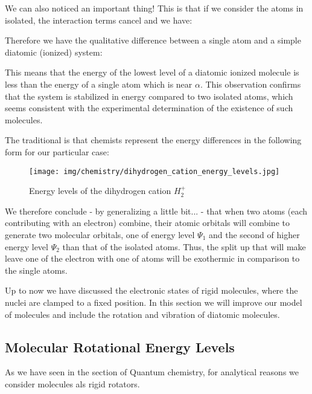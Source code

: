 	We can also noticed an important thing! This is that if we consider the atoms in isolated, the interaction terms cancel and we have:
	
	Therefore we have the qualitative difference between a single atom and a simple diatomic (ionized) system:
	
	This means that the energy of the lowest level of a diatomic ionized molecule is less than the energy of a single atom which is near $\alpha$. This observation confirms that the system is stabilized in energy compared to two isolated atoms, which seems consistent with the experimental determination of the existence of such molecules.
	
	The traditional is that chemists represent the energy differences in the following form for our particular case:
	\begin{figure}[H]
		\begin{center}
		\texttt{[image: img/chemistry/dihydrogen\_cation\_energy\_levels.jpg]}
		\end{center}	
		\caption{Energy levels of the dihydrogen cation $H_2^+$}
	\end{figure}
	We therefore conclude - by generalizing a little bit... - that when two atoms (each contributing with an electron) combine, their atomic orbitals will combine to generate two molecular orbitals, one of energy level $\Psi_1$ and the second of higher energy level $\Psi_2$ than that of the isolated atoms. Thus, the split up that will make leave one of the electron with one of atoms will be exothermic in comparison to the single atoms.
	
	Up to now we have discussed the electronic states of rigid molecules, where the nuclei are clamped to a fixed position. In this section we will improve our model of molecules and include the rotation and vibration of diatomic molecules.

	\pagebreak
	\subsection{Molecular Rotational Energy Levels}
	As we have seen in the section of Quantum chemistry, for analytical reasons we consider molecules als rigid rotators.


